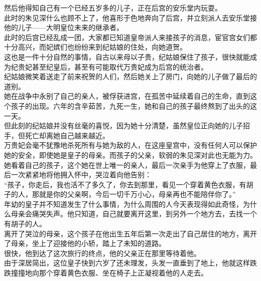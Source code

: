 \begin{multicols}{\theparacolNo}
然后他得知自己有一个已经五岁多的儿子，正在后宫的安乐堂内玩耍。\\

此时的朱见深什么也顾不上了，他喜形于色地奔向了后宫，并立刻派人去安乐堂接他的儿子——大明皇位未来的继承者。\\

此时的后宫已经乱成一团，大家都已知道皇帝派人来接孩子的消息，宦官宫女们都十分高兴，而妃嫔们也纷纷来到纪姑娘的住处，向她道贺。\\

这也是一件十分自然的事情，自古以来母以子贵，纪姑娘保住了孩子，很快就能成为纪贵妃甚至纪皇后，甚至有可能取代万贵妃成为后宫的统治者。\\

纪姑娘微笑着送走了前来祝贺的人们，然后她关上了房门，向她的儿子做了最后的道别。\\

她在战争中永别了自己的亲人，被俘获进宫，在孤苦中延续着自己的生命，直到这个孩子的出现。六年的含辛茹苦，九死一生，她和自己的孩子最终熬到了出头的这一天。\\

但此刻的纪姑娘并没有丝毫的喜悦，因为她十分清楚，虽然皇位正向她的儿子招手，但死亡却离她自己越来越近。\\

万贵妃会毫不犹豫地杀死所有与她为敌的人，在这座皇宫中，没有任何人可以保护她的安全，即使她是皇子的母亲。而孩子的父亲，软弱的朱见深对此也无能为力。\\

她看着自己的孩子，这个她在世上唯一的亲人，最后一次亲手为他穿上了衣服，最后一次紧紧地将他拥入怀中，哭泣着向他告别：\\

“孩子，你走后，我也活不了多久了，你去到那里，看见一个穿着黄色衣服，有胡子的人，那就是你的父亲啊，今后一切千万小心，母亲再也不能陪伴你了。”\\

年幼的皇子并不知道发生了什么事情，为什么周围的人今天表现得如此奇怪，为什么母亲会痛哭失声。他只知道，自己就要离开这里，到另外一个地方去，去找一个有胡子的人。\\

离开了哭泣的母亲，这个孩子在他出生五年后第一次走出了自己居住的地方，离开了母亲，坐上了迎接他的小轿，踏上了未知的道路。\\

很快，他到达了这次旅行的终点，他的父亲正在那里等待着他。\\

由于深居简出，这位皇子快到六岁了还未理发，头发一直垂到了地上，他就这样跌跌撞撞地向那个穿着黄色衣服、坐在椅子上正凝视着他的人走去。\\


\end{multicols}
